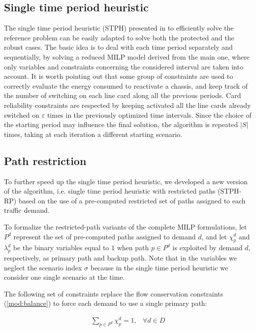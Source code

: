 \documentclass[final,5p,times,twocolumn]{elsarticle}
\begin{document}
\subsection{Single time period heuristic}
The single time period heuristic (STPH) presented in \cite{addis13a} to efficiently solve the reference problem can be easily adapted to solve both the protected and the robust cases. The basic idea is to deal with each time period separately and sequentially, by solving a reduced MILP model derived from the main one, where only variables and constraints concerning the considered interval are taken into account. It is worth pointing out that some group of constraints are used to correctly evaluate the energy consumed to reactivate a chassis, and keep track of the number of switching on  each line card along all the previous periods. Card reliability constraints are respected by keeping activated all the line cards already switched on $\varepsilon$ times in the previously optimized time intervals. Since the choice of the starting period may influence the final solution, the algorithm is repeated $|S|$ times, taking at each iteration a different starting scenario.


\subsection{Path restriction}
To further speed up the single time period heuristic, we developed a new version of the algorithm, i.e. single time period heuristic with restricted paths (STPH-RP) based on the use of a pre-computed restricted set of paths assigned to each traffic demand.

To formalize the restricted-path variants of the complete MILP formulations, let $P^{d}$ represent the set of pre-computed paths assigned to demand $d$, and let $\chi_p^{d}$ and $\lambda_p^{d}$ be the binary variables equal to $1$ when path $p \in P^{d}$ is exploited by demand $d$, respectively, as primary path and backup path. Note that in the variables we neglect the scenario index $\sigma$ because in the single time period heuristic we consider one single scenario at the time.

The following set of constraints replace the flow conservation constraints (\ref{mod:balance}) to force each demand to use a single primary path:

\begin{eqnarray}\label{mod:assign_prima}
\sum_{p \in P^{d}}\chi_p^{d} = 1, & \forall d \in D
\end{eqnarray}
\end{document}

